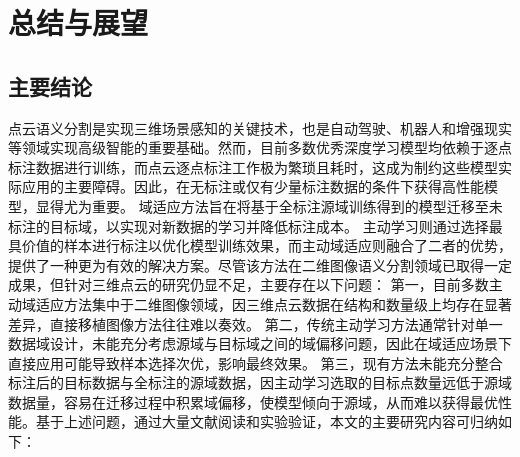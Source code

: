 \chapter{总结与展望}
\thispagestyle{others}
\pagestyle{others}
\xiaosi

\section{主要结论}
点云语义分割是实现三维场景感知的关键技术，也是自动驾驶、机器人和增强现实等领域实现高级智能的重要基础。然而，目前多数优秀深度学习模型均依赖于逐点标注数据进行训练，而点云逐点标注工作极为繁琐且耗时，这成为制约这些模型实际应用的主要障碍。因此，在无标注或仅有少量标注数据的条件下获得高性能模型，显得尤为重要。
域适应方法旨在将基于全标注源域训练得到的模型迁移至未标注的目标域，以实现对新数据的学习并降低标注成本。
主动学习则通过选择最具价值的样本进行标注以优化模型训练效果，而主动域适应则融合了二者的优势，提供了一种更为有效的解决方案。尽管该方法在二维图像语义分割领域已取得一定成果，但针对三维点云的研究仍显不足，主要存在以下问题：
第一，目前多数主动域适应方法集中于二维图像领域，因三维点云数据在结构和数量级上均存在显著差异，直接移植图像方法往往难以奏效。
第二，传统主动学习方法通常针对单一数据域设计，未能充分考虑源域与目标域之间的域偏移问题，因此在域适应场景下直接应用可能导致样本选择次优，影响最终效果。
第三，现有方法未能充分整合标注后的目标数据与全标注的源域数据，因主动学习选取的目标点数量远低于源域数据量，容易在迁移过程中积累域偏移，使模型倾向于源域，从而难以获得最优性能。基于上述问题，通过大量文献阅读和实验验证，本文的主要研究内容可归纳如下：


